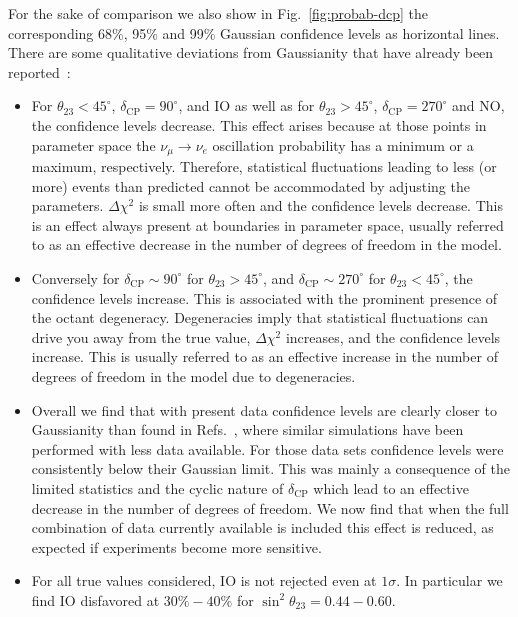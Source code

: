 \documentclass[a4paper, 11pt]{article}
\begin{document}
For the sake of comparison we also show in Fig.~\ref{fig:probab-dcp}
the corresponding 68\%, 95\% and 99\% Gaussian confidence levels as
horizontal lines.  There are some qualitative deviations from
Gaussianity that have already been reported~\cite{Elevant:2015ska}:
%
\begin{itemize}
\item For $\theta_{23}<45^\circ$, $\delta_\text{CP} = 90^\circ$, and
  IO as well as for $\theta_{23} > 45^\circ$, $\delta_\text{CP} =
  270^\circ$ and NO, the confidence levels decrease. This effect
  arises because at those points in parameter space the $\nu_\mu \to
  \nu_e$ oscillation probability has a minimum or a maximum,
  respectively. Therefore, statistical fluctuations leading to less
  (or more) events than predicted cannot be accommodated by adjusting
  the parameters.  $\Delta \chi^2$ is small more often and the
  confidence levels decrease. This is an effect always present at
  boundaries in parameter space, usually referred to as an effective
  decrease in the number of degrees of freedom in the model.

\item Conversely for $\delta_\text{CP} \sim 90^\circ$ for
  $\theta_{23}>45^\circ$, and $\delta_\text{CP} \sim 270^\circ$ for
  $\theta_{23}<45^\circ$, the confidence levels increase. This is
  associated with the prominent presence of the octant
  degeneracy. Degeneracies imply that statistical fluctuations can
  drive you away from the true value, $\Delta \chi^2$ increases, and
  the confidence levels increase. This is usually referred to as an
  effective increase in the number of degrees of freedom in the model
  due to degeneracies.

\item Overall we find that with present data confidence levels are
  clearly closer to Gaussianity than found in
  Refs.~\cite{Gonzalez-Garcia:2014bfa, Elevant:2015ska}, where similar
  simulations have been performed with less data available. For those
  data sets confidence levels were consistently below their Gaussian
  limit. This was mainly a consequence of the limited statistics and
  the cyclic nature of $\delta_\text{CP}$ which lead to an effective
  decrease in the number of degrees of freedom.  We now find that when
  the full combination of data currently available is included this
  effect is reduced, as expected if experiments become more sensitive.

\item For all true values considered, IO is not rejected even at
  $1\sigma$.  In particular we find IO disfavored at $30\% - 40\%$ for
  $\sin^2\theta_{23}=0.44 - 0.60$.
\end{itemize}
\end{document}
